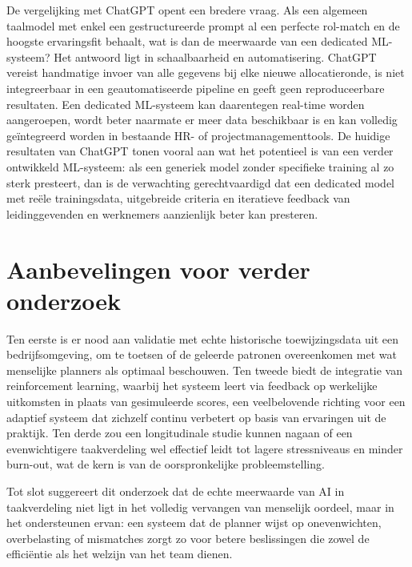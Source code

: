 De vergelijking met ChatGPT opent een bredere vraag. Als een algemeen taalmodel met enkel een gestructureerde prompt al een perfecte rol-match en de hoogste ervaringsfit behaalt, wat is dan de meerwaarde van een dedicated ML-systeem? Het antwoord ligt in schaalbaarheid en automatisering. ChatGPT vereist handmatige invoer van alle gegevens bij elke nieuwe allocatieronde, is niet integreerbaar in een geautomatiseerde pipeline en geeft geen reproduceerbare resultaten. Een dedicated ML-systeem kan daarentegen real-time worden aangeroepen, wordt beter naarmate er meer data beschikbaar is en kan volledig geïntegreerd worden in bestaande HR- of projectmanagementtools. De huidige resultaten van ChatGPT tonen vooral aan wat het potentieel is van een verder ontwikkeld ML-systeem: als een generiek model zonder specifieke training al zo sterk presteert, dan is de verwachting gerechtvaardigd dat een dedicated model met reële trainingsdata, uitgebreide criteria en iteratieve feedback van leidinggevenden en werknemers aanzienlijk beter kan presteren.

\section{Aanbevelingen voor verder onderzoek}

\vspace{1em}Ten eerste is er nood aan validatie met echte historische toewijzingsdata uit een bedrijfsomgeving, om te toetsen of de geleerde patronen overeenkomen met wat menselijke planners als optimaal beschouwen. Ten tweede biedt de integratie van reinforcement learning, waarbij het systeem leert via feedback op werkelijke uitkomsten in plaats van gesimuleerde scores, een veelbelovende richting voor een adaptief systeem dat zichzelf continu verbetert op basis van ervaringen uit de praktijk. Ten derde zou een longitudinale studie kunnen nagaan of een evenwichtigere taakverdeling wel effectief leidt tot lagere stressniveaus en minder burn-out, wat de kern is van de oorspronkelijke probleemstelling.

Tot slot suggereert dit onderzoek dat de echte meerwaarde van AI in taakverdeling niet ligt in het volledig vervangen van menselijk oordeel, maar in het ondersteunen ervan: een systeem dat de planner wijst op onevenwichten, overbelasting of mismatches zorgt zo voor betere beslissingen die zowel de efficiëntie als het welzijn van het team dienen.